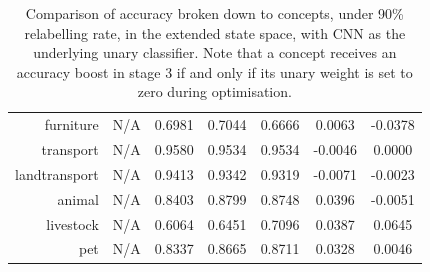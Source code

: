 \documentclass[11pt,a4paper]{article}
\begin{document}
\begin{table}[htbp]
\begin{tabular}{r|c|c|c|c|c|c}
furniture     & N/A    & 0.6981 & 0.7044 & 0.6666 & 0.0063 & -0.0378\\
transport     & N/A    & 0.9580 & 0.9534 & 0.9534 & -0.0046 & 0.0000\\
landtransport & N/A    & 0.9413 & 0.9342 & 0.9319 & -0.0071 & -0.0023\\
animal        & N/A    & 0.8403 & 0.8799 & 0.8748 & 0.0396 & -0.0051\\
livestock     & N/A    & 0.6064 & 0.6451 & 0.7096 & 0.0387 & 0.0645\\
pet           & N/A    & 0.8337 & 0.8665 & 0.8711 & 0.0328 & 0.0046
\end{tabular}
\caption{Comparison of accuracy broken down to concepts, under 90\% relabelling rate, in the extended state space, with CNN as the underlying unary classifier. Note that a concept receives an accuracy boost in stage 3 if and only if its unary weight is set to zero during optimisation.}
\label{tab:cnn90acc}
\end{table}
\end{document}

